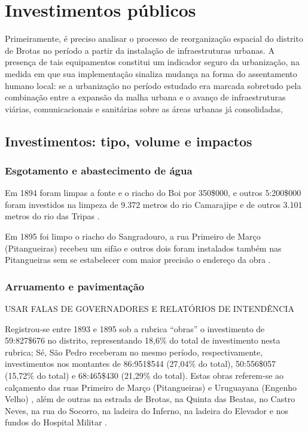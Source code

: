 \section{Investimentos públicos}\label{sec:3.1}

Primeiramente, é preciso analisar o processo de reorganização espacial do distrito de Brotas no período a partir da instalação de infraestruturas urbanas. A presença de tais equipamentos constitui um indicador seguro da urbanização, na medida em que sua implementação sinaliza mudança na forma do assentamento humano local: se a urbanização no período estudado era marcada sobretudo pela combinação entre a expansão da malha urbana e o avanço de infraestruturas viárias, comunicacionais e sanitárias sobre as áreas urbanas já consolidadas, 

\subsection{Investimentos: tipo, volume e impactos}\label{investbrotas}

\subsubsection{Esgotamento e abastecimento de água}

Em 1894 foram limpas a fonte e o riacho do Boi por 350\$000, e outros 5:200\$000 foram investidos na limpeza de 9.372 metros do rio Camarajipe e de outros 3.101 metros do rio das Tripas \cite[p.~156]{salvador_relatorio_1894}.

Em 1895 foi limpo o riacho do Sangradouro, a rua Primeiro de Março (Pitangueiras) recebeu um sifão e outros dois foram instalados também nas Pitangueiras sem se estabelecer com maior precisão o endereço da obra \cite[pp.~20, 137-138]{salvador_relatorio_1896}. 





\subsubsection{Arruamento e pavimentação}

USAR FALAS DE GOVERNADORES E RELATÓRIOS DE INTENDÊNCIA

Registrou-se entre 1893 e 1895 sob a rubrica ``obras'' o investimento de 59:827\$676 no distrito, representando 18,6\% do total de investimento nesta rubrica; Sé, São Pedro receberam no mesmo período, respectivamente, investimentos nos montantes de 86:951\$544 (27,04\% do total), 50:556\$057 (15,72\% do total) e 68:465\$430 (21,29\% do total). Estas obras referem-se ao calçamento das ruas Primeiro de Março (Pitangueiras) e Uruguayana (Engenho Velho) \cite[pp.~21-23, 138]{salvador_relatorio_1896}, além de outras na estrada de Brotas, na Quinta das Beatas, no Castro Neves, na rua do Socorro, na ladeira do Inferno, na ladeira do Elevador e nos fundos do Hospital Militar \cite[p.~157]{salvador_relatorio_1894}.


